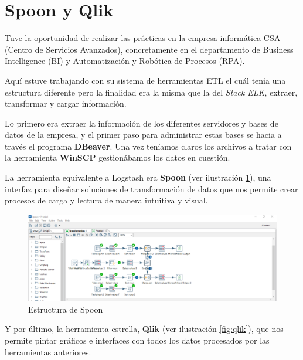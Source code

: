 \paragraph{            }
\paragraph{            }


\section{Spoon y Qlik}
Tuve la oportunidad de realizar las prácticas en la empresa informática CSA (Centro de Servicios Avanzados), concretamente en el departamento de Business Intelligence (BI) y Automatización y Robótica de Procesos (RPA). 

Aquí estuve trabajando con su sistema de herramientas ETL el cuál tenía una estructura diferente pero la finalidad era la misma que la del \textit{Stack ELK}, extraer, transformar y cargar información.

Lo primero era extraer la información de los diferentes servidores y bases de datos de la empresa, y el primer paso para administrar estas bases se hacia a través el programa \textbf{DBeaver}. Una vez teníamos claros los archivos a tratar con la herramienta \textbf{WinSCP} gestionábamos los datos en cuestión. 

La herramienta equivalente a Logstash era \textbf{Spoon}  (ver ilustración  \ref{fig:spoon}), una interfaz para diseñar soluciones de transformación de datos que nos permite crear procesos de carga y lectura de manera intuitiva y visual.

\begin{figure}
    \centering
    \includegraphics[width=1\linewidth]{img/spoon.png}
    \caption{Estructura de Spoon \cite{Spoon} }
    \label{fig:spoon}
\end{figure}

Y por último, la herramienta estrella, \textbf{Qlik}  (ver ilustración   \ref{fig:qlik}), que nos permite pintar gráficos e interfaces con todos los datos procesados por las herramientas anteriores.

